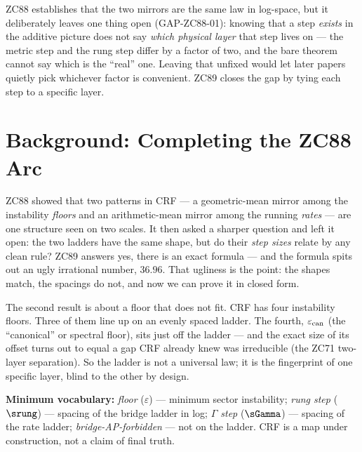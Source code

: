 \documentclass[12pt, a4paper]{article}
\renewcommand{\epscan}{\varepsilon_{\rm can}}   %
\begin{document}


\noindent
ZC88 establishes that the two mirrors are the same law in log-space, but it
deliberately leaves one thing open (GAP-ZC88-01): knowing that a step
\emph{exists} in the additive picture does not say \emph{which physical
layer} that step lives on --- the metric step and the rung step differ by a
factor of two, and the bare theorem cannot say which is the ``real'' one.
Leaving that unfixed would let later papers quietly pick whichever factor
is convenient. ZC89 closes the gap by tying each step to a specific layer.
\section{Background: Completing the ZC88 Arc}
\label{sec:background-zc89}

\begin{keybox}[title={If you are just arriving --- ZC89 in plain language}]
\sloppy
ZC88 showed that two patterns in CRF --- a geometric-mean mirror among the
instability \emph{floors} and an arithmetic-mean mirror among the running
\emph{rates} --- are one structure seen on two scales. It then asked a
sharper question and left it open: the two ladders have the same shape, but
do their \emph{step sizes} relate by any clean rule? ZC89 answers yes,
there is an exact formula --- and the formula spits out an ugly irrational
number, $36.96$. That ugliness is the point: the shapes match, the spacings
do not, and now we can prove it in closed form.

The second result is about a floor that does not fit. CRF has four
instability floors. Three of them line up on an evenly spaced ladder. The
fourth, $\epscan$ (the ``canonical'' or spectral floor), sits just off the
ladder --- and the exact size of its offset turns out to equal a gap CRF
already knew was irreducible (the ZC71 two-layer separation). So the ladder
is not a universal law; it is the fingerprint of one specific layer, blind
to the other by design.

\textbf{Minimum vocabulary:}
\textit{floor} ($\varepsilon$) --- minimum sector instability;\;
\textit{rung step} ($\srung$) --- spacing of the bridge ladder in log;\;
\textit{$\Gamma$ step} ($\sGamma$) --- spacing of the rate ladder;\;
\textit{bridge-AP-forbidden} --- not on the ladder.
CRF is a map under construction, not a claim of final truth.
\end{keybox}
\end{document}
